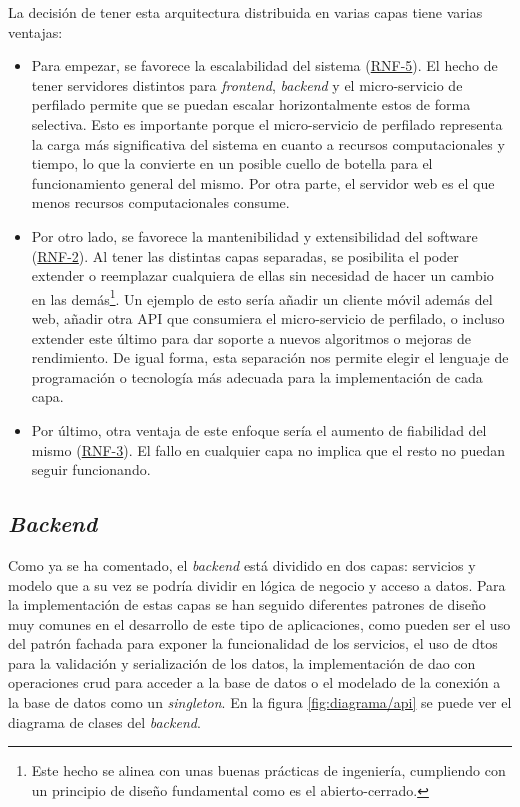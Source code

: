 La decisión de tener esta arquitectura distribuida en varias capas tiene varias ventajas:
\begin{itemize}
    \item Para empezar, se favorece la escalabilidad del sistema (\hyperref[tab:rnf]{RNF-5}). El hecho de tener servidores distintos para \textit{frontend}, \textit{backend} y el micro-servicio de perfilado permite que se puedan escalar horizontalmente estos de forma selectiva. Esto es importante porque el micro-servicio de perfilado representa la carga más significativa del sistema en cuanto a recursos computacionales y tiempo, lo que la convierte en un posible cuello de botella para el funcionamiento general del mismo. Por otra parte, el servidor web es el que menos recursos computacionales consume.
    \item Por otro lado, se favorece la mantenibilidad y extensibilidad del software (\hyperref[tab:rnf]{RNF-2}). Al tener las distintas capas separadas, se posibilita el poder extender o reemplazar cualquiera de ellas sin necesidad de hacer un cambio en las demás\footnote{Este hecho se alinea con unas buenas prácticas de ingeniería, cumpliendo con un principio de diseño fundamental como es el abierto-cerrado.}. Un ejemplo de esto sería añadir un cliente móvil además del web, añadir otra API que consumiera el micro-servicio de perfilado, o incluso extender este último para dar soporte a nuevos algoritmos o mejoras de rendimiento. De igual forma, esta separación nos permite elegir el lenguaje de programación o tecnología más adecuada para la implementación de cada capa.
    \item Por último, otra ventaja de este enfoque sería el aumento de fiabilidad del mismo (\hyperref[tab:rnf]{RNF-3}). El fallo en cualquier capa no implica que el resto no puedan seguir funcionando.
\end{itemize}

\subsection{\textit{Backend}}

Como ya se ha comentado, el \textit{backend} está dividido en dos capas: servicios y modelo que a su vez se podría dividir en lógica de negocio y acceso a datos. Para la implementación de estas capas se han seguido diferentes patrones de diseño muy comunes en el desarrollo de este tipo de aplicaciones, como pueden ser el uso del patrón fachada para exponer la funcionalidad de los servicios, el uso de \acrfull{dto}s para la validación y serialización de los datos, la implementación de \acrfull{dao} con operaciones \acrfull{crud} para acceder a la base de datos o el modelado de la conexión a la base de datos como un \textit{singleton}. En la figura \ref{fig:diagrama/api} se puede ver el diagrama de clases del \textit{backend}.

